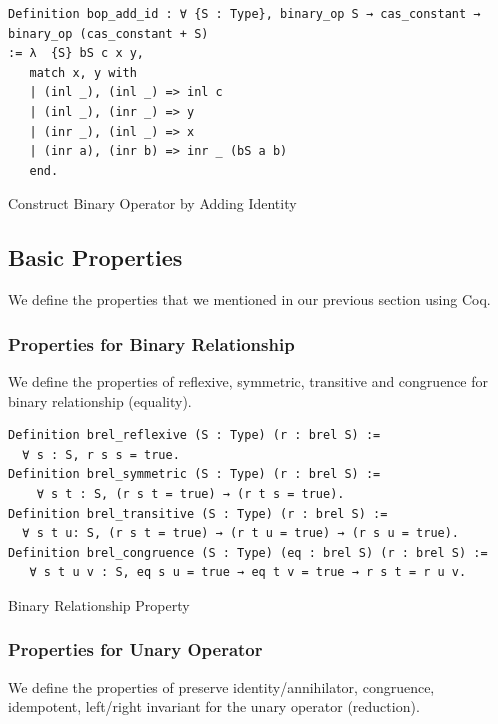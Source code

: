 \documentclass[a4paper,12pt,twoside,openright]{report}
\begin{document}
\begin{listing}[H]
\begin{verbatim}
Definition bop_add_id : ∀ {S : Type}, binary_op S → cas_constant → binary_op (cas_constant + S)
:= λ  {S} bS c x y, 
   match x, y with
   | (inl _), (inl _) => inl c 
   | (inl _), (inr _) => y
   | (inr _), (inl _) => x
   | (inr a), (inr b) => inr _ (bS a b)
   end.
\end{verbatim}
\caption{Construct Binary Operator by Adding Identity} 
\label{coq:def:add_const_ann}
\end{listing}

\subsection{Basic Properties}

We define the properties that we mentioned in our previous section using Coq.

\subsubsection{Properties for Binary Relationship}
We define the properties of reflexive, symmetric, transitive and congruence for binary relationship (equality).

\begin{listing}[H]
\begin{verbatim}
Definition brel_reflexive (S : Type) (r : brel S) :=
  ∀ s : S, r s s = true.
Definition brel_symmetric (S : Type) (r : brel S) := 
    ∀ s t : S, (r s t = true) → (r t s = true). 
Definition brel_transitive (S : Type) (r : brel S) := 
  ∀ s t u: S, (r s t = true) → (r t u = true) → (r s u = true).
Definition brel_congruence (S : Type) (eq : brel S) (r : brel S) := 
   ∀ s t u v : S, eq s u = true → eq t v = true → r s t = r u v.
\end{verbatim}
\caption{Binary Relationship Property} 
\label{coq:def:brel_properties}
\end{listing}

\subsubsection{Properties for Unary Operator}
We define the properties of preserve identity/annihilator, congruence, idempotent, left/right invariant for the unary operator (reduction).
\end{document}
